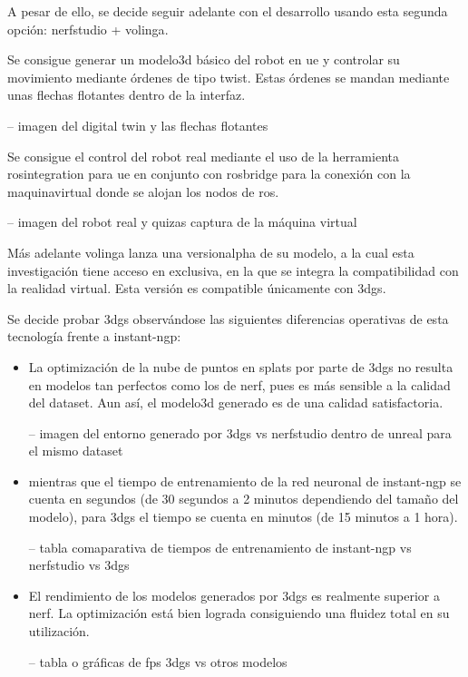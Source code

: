 \documentclass[a4paper, 12pt, spanish, twoside]{article}
\begin{document}
A pesar de ello, se decide seguir adelante con el desarrollo usando esta segunda opción: \gls{nerfstudio}  + \gls{volinga}. 

Se consigue generar un \gls{modelo3d} básico del robot en \acrshort{ue} y controlar su movimiento mediante órdenes de tipo \gls{twist}. Estas órdenes se mandan mediante unas flechas flotantes dentro de la interfaz. 

-- imagen del digital twin y las flechas flotantes 

Se consigue el control del robot real mediante el uso de la herramienta \gls{rosintegration} para \acrshort{ue} en conjunto con \gls{rosbridge} para la conexión con la \gls{maquinavirtual} donde se alojan los nodos de \acrshort{ros}. 

-- imagen del robot real y quizas captura de la máquina virtual 

Más adelante \gls{volinga} lanza una \gls{versionalpha} de su modelo, a la cual esta investigación tiene acceso en exclusiva, en la que se integra la compatibilidad con la realidad virtual. Esta versión es compatible únicamente con \acrshort{3dgs}. 

Se decide probar \acrshort{3dgs} observándose las siguientes diferencias operativas de esta tecnología frente a \gls{instant-ngp}: 

\begin{itemize} 

\item La optimización de la nube de puntos en \glspl{splat} por parte de \acrshort{3dgs} no resulta en modelos tan perfectos como los de \acrshort{nerf}, pues es más sensible a la calidad del \gls{dataset}. Aun así, el \gls{modelo3d} generado es de una calidad satisfactoria. 

-- imagen del entorno generado por 3dgs vs nerfstudio dentro de unreal para el mismo dataset 

\item mientras que el tiempo de entrenamiento de la red neuronal de \gls{instant-ngp} se cuenta en segundos (de 30 segundos a 2 minutos dependiendo del tamaño del modelo), para \acrshort{3dgs} el tiempo se cuenta en minutos (de 15 minutos a 1 hora). 

-- tabla comaparativa de tiempos de entrenamiento de instant-ngp vs nerfstudio vs 3dgs 

\item El rendimiento de los modelos generados por \acrshort{3dgs} es realmente superior a \gls{nerf}. La optimización está bien lograda consiguiendo una fluidez total en su utilización. 

-- tabla o gráficas de fps 3dgs vs otros modelos 

\end{itemize} 
\end{document}
